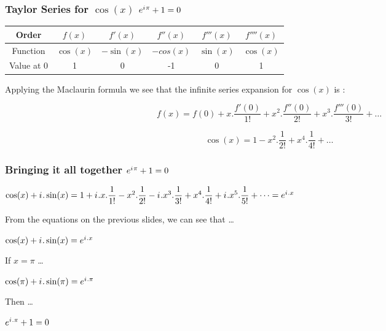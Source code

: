 \documentclass[10pt]{beamer}
\newcommand{\iu}{{i\mkern1mu}}
\begin{document}
\begin{frame}
	\frametitle{Taylor Series for $\cos(x)$ \hspace{25pt} \textcolor{pink}{\Huge\(e^{\iu \pi} +1 = 0\)}}
	\begin{center}
		\begin{tabular}{|c|c|c|c|c|c|}
			\hline
			Order & $f(x)$    & $f'(x)$    & $f''(x)$  & $f'''(x)$ & $f''''(x)$ \\
			\hline
			Function & $\cos(x)$ & $-\sin(x)$ & $-cos(x)$ & $\sin(x)$ & $\cos(x)$  \\
			\hline
			Value at 0 & 1         & 0          & -1        & 0         & 1          \\
			\hline
		\end{tabular}
	\end{center}
	\vspace{20pt}
	Applying the Maclaurin formula we see that the infinite series expansion for $\cos(x)$ is :

	\large $$f(x) = f(0)+x.\dfrac{f'(0)}{1!}+ x^2.\dfrac{f''(0)}{2!} +x^3.\dfrac{f'''(0)}{3!} + \dots$$

	\large $$\cos(x) = 1- x^2.\dfrac{1}{2!} +x^4.\dfrac{1}{4!} + \dots$$

\end{frame}

\begin{frame}
	\frametitle{Bringing it all together \hspace{25pt} \textcolor{pink}{\Huge\(e^{\iu \pi} +1 = 0\)}}
	\begin{center}
	$\cos(x) + \iu.\sin(x) = 1+\iu.x.\dfrac{1}{1!}- x^2.\dfrac{1}{2!} -\iu.x^3.\dfrac{1}{3!} +x^4.\dfrac{1}{4!} + \iu.x^5.\dfrac{1}{5!} +\dots = e^{\iu.x}$
	\end{center}

	From the equations on the previous slides, we can see that \dots
	\begin{center}
		$\cos(x) + \iu.\sin(x) = e^{\iu.x}$ 
	\end{center} 
	If $x = \pi$ \dots
	\begin{center}
		$\cos(\pi) + \iu.\sin(\pi) = e^{\iu.\pi}$ \\
	\end{center}
	Then \dots
	\begin{center}
		$e^{\iu.\pi} + 1 = 0$
	\end{center}
\end{frame}
\end{document}

